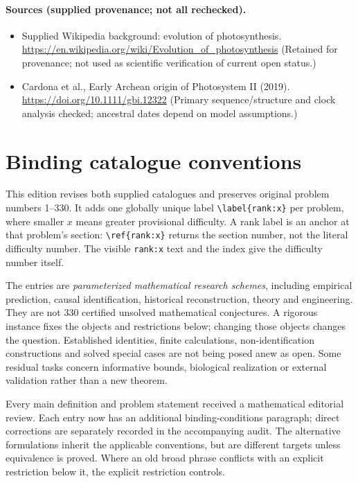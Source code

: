 \documentclass[11pt]{article}
\begin{document}
\paragraph{Sources (supplied provenance; not all rechecked).} \begin{itemize}
\item Supplied Wikipedia background: evolution of photosynthesis. \url{https://en.wikipedia.org/wiki/Evolution_of_photosynthesis} (Retained for provenance; not used as scientific verification of current open status.)
\item Cardona et al., Early Archean origin of Photosystem II (2019). \url{https://doi.org/10.1111/gbi.12322} (Primary sequence/structure and clock analysis checked; ancestral dates depend on model assumptions.)
\end{itemize}


\section*{Binding catalogue conventions}
This edition revises both supplied catalogues and preserves original problem numbers 1--330. It adds one globally unique label \verb|\label{rank:x}| per problem, where smaller $x$ means greater provisional difficulty. A rank label is an anchor at that problem's section: \verb|\ref{rank:x}| returns the section number, not the literal difficulty number. The visible \texttt{rank:x} text and the index give the difficulty number itself.

The entries are \emph{parameterized mathematical research schemes}, including empirical prediction, causal identification, historical reconstruction, theory and engineering. They are not 330 certified unsolved mathematical conjectures. A rigorous instance fixes the objects and restrictions below; changing those objects changes the question. Established identities, finite calculations, non-identification constructions and solved special cases are not being posed anew as open. Some residual tasks concern informative bounds, biological realization or external validation rather than a new theorem.

Every main definition and problem statement received a mathematical editorial review. Each entry now has an additional binding-conditions paragraph; direct corrections are separately recorded in the accompanying audit. The alternative formulations inherit the applicable conventions, but are different targets unless equivalence is proved. Where an old broad phrase conflicts with an explicit restriction below it, the explicit restriction controls.
\end{document}

